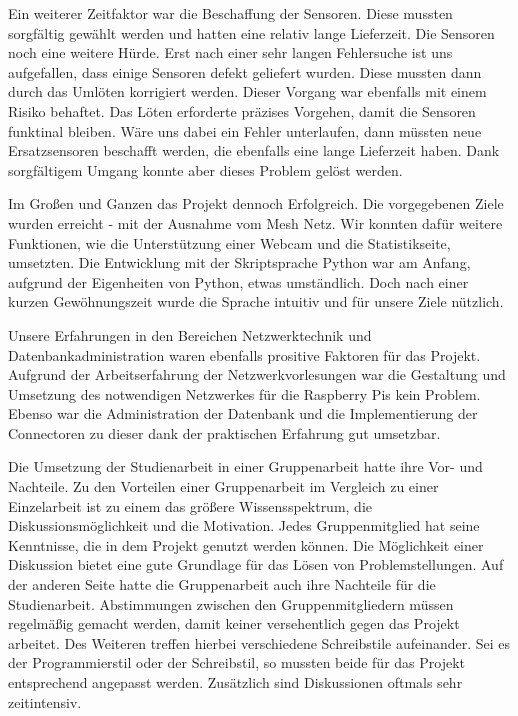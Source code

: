 	Ein weiterer Zeitfaktor war die Beschaffung der Sensoren. Diese mussten sorgfältig gewählt werden und hatten eine relativ lange Lieferzeit.
	Die Sensoren noch eine weitere Hürde. Erst nach einer sehr langen Fehlersuche ist uns aufgefallen, dass einige Sensoren defekt geliefert wurden. Diese mussten dann durch das Umlöten korrigiert werden. Dieser Vorgang war ebenfalls mit einem Risiko behaftet. Das Löten erforderte präzises Vorgehen, damit die Sensoren funktinal bleiben. Wäre uns dabei ein Fehler unterlaufen, dann müssten neue Ersatzsensoren beschafft werden, die ebenfalls eine lange Lieferzeit haben. Dank sorgfältigem Umgang konnte aber dieses Problem gelöst werden.
	
	Im Großen und Ganzen das Projekt dennoch Erfolgreich. Die vorgegebenen Ziele wurden erreicht - mit der Ausnahme vom Mesh Netz. Wir konnten dafür weitere Funktionen, wie die Unterstützung einer Webcam und die Statistikseite, umsetzten. Die Entwicklung mit der Skriptsprache Python war am Anfang, aufgrund der Eigenheiten von Python, etwas umständlich. Doch nach einer kurzen Gewöhnungszeit wurde die Sprache intuitiv und für unsere Ziele nützlich.
	
	Unsere Erfahrungen in den Bereichen Netzwerktechnik und Datenbankadministration waren ebenfalls prositive Faktoren für das Projekt.
	Aufgrund der Arbeitserfahrung der Netzwerkvorlesungen war die Gestaltung und Umsetzung des notwendigen Netzwerkes für die Raspberry Pis kein Problem.  
	Ebenso war die Administration der Datenbank und die Implementierung der Connectoren zu dieser dank der praktischen Erfahrung gut umsetzbar.
	
	Die Umsetzung der Studienarbeit in einer Gruppenarbeit hatte ihre Vor- und Nachteile. Zu den Vorteilen einer Gruppenarbeit im Vergleich zu einer Einzelarbeit ist zu einem das größere Wissensspektrum, die Diskussionsmöglichkeit und die Motivation. Jedes Gruppenmitglied hat seine Kenntnisse, die in dem Projekt genutzt werden können. Die Möglichkeit einer Diskussion bietet eine gute Grundlage für das Lösen von Problemstellungen. Auf der anderen Seite hatte die Gruppenarbeit auch ihre Nachteile für die Studienarbeit. Abstimmungen zwischen den Gruppenmitgliedern müssen regelmäßig gemacht werden, damit keiner versehentlich gegen das Projekt arbeitet. Des Weiteren treffen hierbei verschiedene Schreibstile aufeinander. Sei es der Programmierstil oder der Schreibstil, so mussten beide für das Projekt entsprechend angepasst werden. Zusätzlich sind Diskussionen oftmals sehr zeitintensiv.
	
